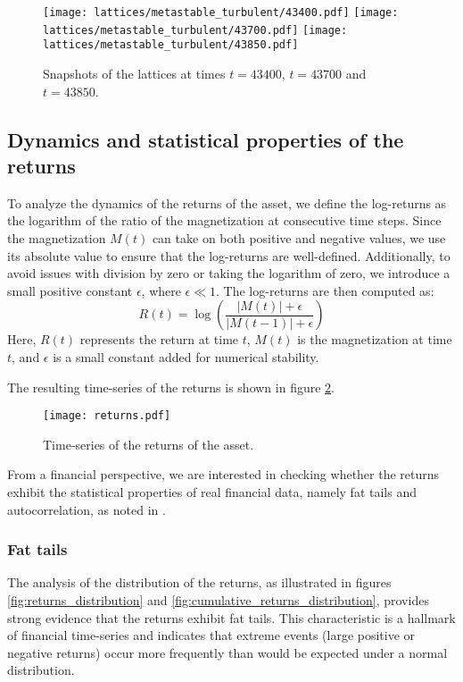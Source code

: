 \begin{figure}[H]
    \centering
    \texttt{[image: lattices/metastable\_turbulent/43400.pdf]}
    \texttt{[image: lattices/metastable\_turbulent/43700.pdf]}
    \texttt{[image: lattices/metastable\_turbulent/43850.pdf]}
    \caption{Snapshots of the lattices at times $t=43400$, $t=43700$ and $t=43850$.}
    \label{fig:lattices}
\end{figure}

\subsection{Dynamics and statistical properties of the returns}
To analyze the dynamics of the returns of the asset, we define the log-returns as the logarithm of the ratio of the magnetization at consecutive time steps. Since the magnetization $M(t)$ can take on both positive and negative values, we use its absolute value to ensure that the log-returns are well-defined. Additionally, to avoid issues with division by zero or taking the logarithm of zero, we introduce a small positive constant $\epsilon$, where $\epsilon \ll 1$. The log-returns are then computed as:
\begin{equation}
    R(t) = \log\left(\frac{|M(t)| + \epsilon}{|M(t-1)| + \epsilon}\right)
\end{equation}
Here, $R(t)$ represents the return at time $t$, $M(t)$ is the magnetization at time $t$, and $\epsilon$ is a small constant added for numerical stability.

The resulting time-series of the returns is shown in figure \ref{fig:returns}.

\begin{figure}[H]
    \centering
    \texttt{[image: returns.pdf]}
    \caption{Time-series of the returns of the asset.}
    \label{fig:returns}
\end{figure}

From a financial perspective, we are interested in checking whether the returns exhibit the statistical properties of real financial data, namely fat tails and autocorrelation, as noted in \cite{bouchaud2000theory}.

\subsubsection{Fat tails}
The analysis of the distribution of the returns, as illustrated in figures \ref{fig:returns_distribution} and \ref{fig:cumulative_returns_distribution}, provides strong evidence that the returns exhibit fat tails. This characteristic is a hallmark of financial time-series and indicates that extreme events (large positive or negative returns) occur more frequently than would be expected under a normal distribution.

